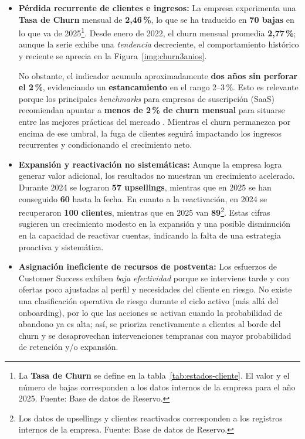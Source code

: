 \begin{itemize}
    \item \textbf{Pérdida recurrente de clientes e ingresos:} La empresa experimenta una \textbf{Tasa de Churn} mensual de \textbf{2,46\,\%}, lo que se ha traducido en \textbf{70 bajas} en lo que va de 2025\footnote{La \textbf{Tasa de Churn} se define en la tabla~\ref{tab:estados-cliente}. El valor y el número de bajas corresponden a los datos internos de la empresa para el año 2025. Fuente: Base de datos de Reservo.}. Desde enero de 2022, el churn mensual promedia \textbf{2,77\,\%}; aunque la serie exhibe una \textit{tendencia} decreciente, el comportamiento histórico y reciente se aprecia en la Figura~\ref{img:churn3anios}.

    No obstante, el indicador acumula aproximadamente \textbf{dos años sin perforar el 2\,\%}, evidenciando un \textbf{estancamiento} en el rango 2–3\,\%. Esto es relevante porque los principales \textit{benchmarks} para empresas de suscripción (SaaS) recomiendan apuntar a \textbf{menos de 2\,\% de churn mensual} para situarse entre las mejores prácticas del mercado \citep{ChartMogul2023ChurnRate}. Mientras el churn permanezca por encima de ese umbral, la fuga de clientes seguirá impactando los ingresos recurrentes y condicionando el crecimiento neto.


    \item \textbf{Expansión y reactivación no sistemáticas:} Aunque la empresa logra generar valor adicional, los resultados no muestran un crecimiento acelerado. Durante 2024 se lograron \textbf{57 upsellings}, mientras que en 2025 se han conseguido \textbf{60} hasta la fecha. En cuanto a la reactivación, en 2024 se recuperaron \textbf{100 clientes}, mientras que en 2025 van \textbf{89}\footnote{Los datos de upsellings y clientes reactivados corresponden a los registros internos de la empresa. Fuente: Base de datos de Reservo.}. Estas cifras sugieren un crecimiento modesto en la expansión y una posible disminución en la capacidad de reactivar cuentas, indicando la falta de una estrategia proactiva y sistemática.

    \item \textbf{Asignación ineficiente de recursos de postventa:} Los esfuerzos de Customer Success exhiben \textit{baja efectividad} porque se interviene tarde y con ofertas poco ajustadas al perfil y necesidades del cliente en riesgo. No existe una clasificación operativa de riesgo durante el ciclo activo (más allá del onboarding), por lo que las acciones se activan cuando la probabilidad de abandono ya es alta; así, se prioriza reactivamente a clientes al borde del churn y se desaprovechan intervenciones tempranas con mayor probabilidad de retención y/o expansión.

\end{itemize}

